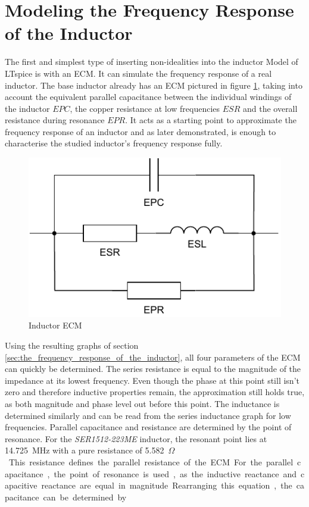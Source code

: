 \section{Modeling the Frequency Response of the Inductor} \label{sec:modeling_the_frequency_response_of_the_inductor}
The first and simplest type of inserting non-idealities into the inductor Model of LTspice is with an \ac{ECM}. It can simulate the frequency response of a real inductor. The base inductor already has an \ac{ECM} pictured in figure \ref{fig:inductor_ecm}, taking into account the equivalent parallel capacitance between the individual windings of the inductor $EPC$, the copper resistance at low frequencies $ESR$ and the overall resistance during resonance $EPR$. It acts as a starting point to approximate the frequency response of an inductor and as later demonstrated, is enough to characterise the studied inductor's frequency response fully.
\begin{figure}[H]
    \centering
    \includegraphics[width=0.5\linewidth]{Bilder//Kapitel3/Inductor_ECM.pdf}
    \caption{Inductor \ac{ECM}}
    \label{fig:inductor_ecm}
\end{figure}
Using the resulting graphs of section \ref{sec:the_frequency_response_of_the_inductor}, all four parameters of the \ac{ECM} can quickly be determined. The series resistance is equal to the magnitude of the impedance at its lowest frequency. Even though the phase at this point still isn't zero and therefore inductive properties remain, the approximation still holds true, as both magnitude and phase level out before this point. The inductance is determined similarly and can be read from the series inductance graph for low frequencies. Parallel capacitance and resistance are determined by the point of resonance. For the \textit{SER1512-223ME} inductor, the resonant point lies at \SI{14,725}{\mega\Hz} with a pure resistance of \SI{5,582}{\kilo$\Omega$}. This resistance defines the parallel resistance of the \ac{ECM}. For the parallel capacitance, the point of resonance is used, as the inductive reactance and capacitive reactance are equal in magnitude. Rearranging this equation, the capacitance can be determined by
